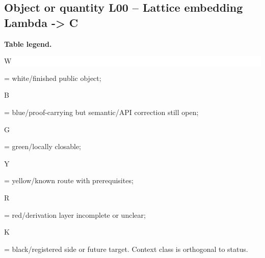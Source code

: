 \subsection*{Object or quantity L00 -- Lattice embedding Lambda -> C}
\hypertarget{objproof:L00}{}
\par\smallskip\noindent\begin{minipage}{0.99\linewidth}\footnotesize\raggedright\textbf{Table legend.} \colorbox{white}{\strut W} = white/finished public object; \colorbox{cyan!20}{\strut B} = blue/proof-carrying but semantic/API correction still open; \colorbox{green!18}{\strut G} = green/locally closable; \colorbox{yellow!25}{\strut Y} = yellow/known route with prerequisites; \colorbox{red!20}{\strut R} = red/derivation layer incomplete or unclear; \colorbox{black!18}{\strut K} = black/registered side or future target. Context class is orthogonal to status.\end{minipage}\par\vspace{0.25em}
